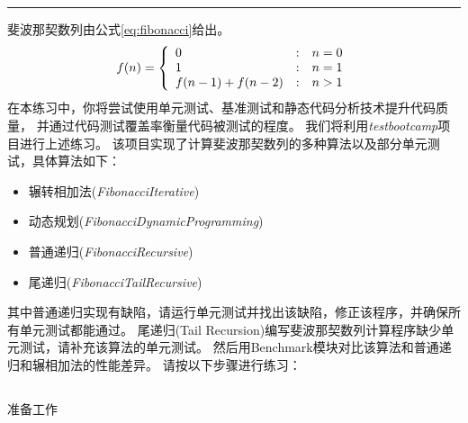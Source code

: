 \documentclass[12pt,addpoints,fleqn]{exam}
\begin{document}
\noindent
\rule[2ex]{\textwidth}{2pt}

\newpage

\begin{questions}
  \pointsinrightmargin
  \setlength{\rightpointsmargin}{2cm}
  \CorrectChoiceEmphasis{\color{red}\itshape}

\newpage
\question[40] 斐波那契数列由公式\ref{eq:fibonacci}给出。
\begin{equation}
    \label{eq:fibonacci}
    f(n)=\left\{
        \begin{array}{l@{\quad:\quad}l}
            0  & n=0 \\
            1  & n=1 \\
            f(n-1) + f(n-2) & n>1
        \end{array}
    \right.
\end{equation}
在本练习中，你将尝试使用单元测试、基准测试和静态代码分析技术提升代码质量，
并通过代码测试覆盖率衡量代码被测试的程度。
我们将利用\emph{testbootcamp}项目进行上述练习。
该项目实现了计算斐波那契数列的多种算法以及部分单元测试，具体算法如下：
\begin{itemize}
    \item 辗转相加法(\emph{FibonacciIterative})
    \item 动态规划(\emph{FibonacciDynamicProgramming})
    \item 普通递归(\emph{FibonacciRecursive})
    \item 尾递归(\emph{FibonacciTailRecursive})
\end{itemize}

其中普通递归实现有缺陷，请运行单元测试并找出该缺陷，修正该程序，并确保所有单元测试都能通过。
尾递归(Tail Recursion)编写斐波那契数列计算程序缺少单元测试，请补充该算法的单元测试。
然后用Benchmark模块对比该算法和普通递归和辗相加法的性能差异。
请按以下步骤进行练习：


\newpage
\begin{parts}
  \part{}准备工作


\end{parts}
\end{questions}
\end{document}

